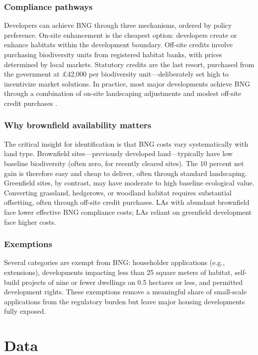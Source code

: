 \documentclass[12pt]{article}
\begin{document}
\subsubsection*{Compliance pathways} Developers can achieve BNG through three mechanisms, ordered by policy preference. On-site enhancement is the cheapest option: developers create or enhance habitats within the development boundary. Off-site credits involve purchasing biodiversity units from registered habitat banks, with prices determined by local markets. Statutory credits are the last resort, purchased from the government at \pounds42,000 per biodiversity unit---deliberately set high to incentivize market solutions. In practice, most major developments achieve BNG through a combination of on-site landscaping adjustments and modest off-site credit purchases \citep{DEFRA2023}.

\subsubsection*{Why brownfield availability matters} The critical insight for identification is that BNG costs vary systematically with land type. Brownfield sites---previously developed land---typically have low baseline biodiversity (often zero, for recently cleared sites). The 10 percent net gain is therefore easy and cheap to deliver, often through standard landscaping. Greenfield sites, by contrast, may have moderate to high baseline ecological value. Converting grassland, hedgerows, or woodland habitat requires substantial offsetting, often through off-site credit purchases. LAs with abundant brownfield face lower effective BNG compliance costs; LAs reliant on greenfield development face higher costs.

\subsubsection*{Exemptions} Several categories are exempt from BNG: householder applications (e.g., extensions), developments impacting less than 25 square meters of habitat, self-build projects of nine or fewer dwellings on 0.5 hectares or less, and permitted development rights. These exemptions remove a meaningful share of small-scale applications from the regulatory burden but leave major housing developments fully exposed.

\section{Data}
\end{document}
